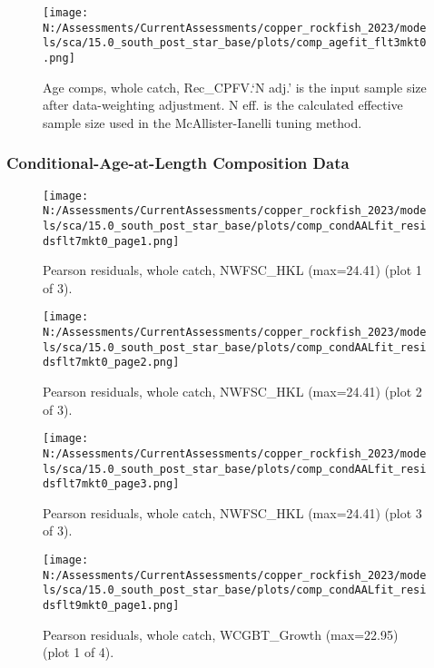 \documentclass[11pt,
  english,
  letterpaper,
]{article}
\begin{document}
\begin{figure}
\centering
\texttt{[image: N:/Assessments/CurrentAssessments/copper\_rockfish\_2023/models/sca/15.0\_south\_post\_star\_base/plots/comp\_agefit\_flt3mkt0.png]}
\caption{Age comps, whole catch, Rec\_CPFV.`N adj.' is the input sample size after data-weighting adjustment. N eff. is the calculated effective sample size used in the McAllister-Ianelli tuning method.\label{fig:comp_agefit_flt3mkt0}}
\end{figure}

\newpage

\hypertarget{caal-data}{%
\subsubsection{Conditional-Age-at-Length Composition Data}\label{caal-data}}

\begin{figure}
\centering
\texttt{[image: N:/Assessments/CurrentAssessments/copper\_rockfish\_2023/models/sca/15.0\_south\_post\_star\_base/plots/comp\_condAALfit\_residsflt7mkt0\_page1.png]}
\caption{Pearson residuals, whole catch, NWFSC\_HKL (max=24.41) (plot 1 of 3).\label{fig:comp_condAALfit_residsflt7mkt0_page1}}
\end{figure}

\begin{figure}
\centering
\texttt{[image: N:/Assessments/CurrentAssessments/copper\_rockfish\_2023/models/sca/15.0\_south\_post\_star\_base/plots/comp\_condAALfit\_residsflt7mkt0\_page2.png]}
\caption{Pearson residuals, whole catch, NWFSC\_HKL (max=24.41) (plot 2 of 3).\label{fig:comp_condAALfit_residsflt7mkt0_page2}}
\end{figure}

\begin{figure}
\centering
\texttt{[image: N:/Assessments/CurrentAssessments/copper\_rockfish\_2023/models/sca/15.0\_south\_post\_star\_base/plots/comp\_condAALfit\_residsflt7mkt0\_page3.png]}
\caption{Pearson residuals, whole catch, NWFSC\_HKL (max=24.41) (plot 3 of 3).\label{fig:comp_condAALfit_residsflt7mkt0_page3}}
\end{figure}

\begin{figure}
\centering
\texttt{[image: N:/Assessments/CurrentAssessments/copper\_rockfish\_2023/models/sca/15.0\_south\_post\_star\_base/plots/comp\_condAALfit\_residsflt9mkt0\_page1.png]}
\caption{Pearson residuals, whole catch, WCGBT\_Growth (max=22.95) (plot 1 of 4).\label{fig:comp_condAALfit_residsflt9mkt0_page1}}
\end{figure}
\end{document}
